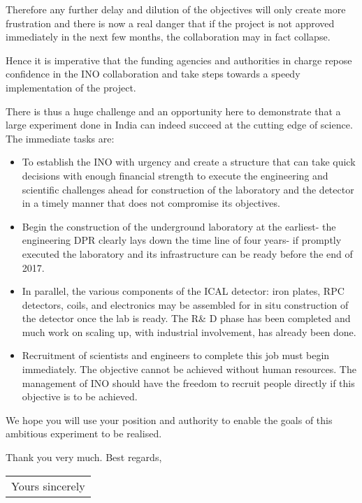 Therefore any further delay and dilution of the objectives will only
create more frustration and there is now a real danger that if the project
is not approved immediately in the next few months, the collaboration may
in fact collapse.


Hence it is imperative that the funding agencies and autho\-rities in charge
repose confidence in the INO collaboration and take steps towards a speedy
implementation of the project.

There is thus a huge challenge and an opportunity here to demonstrate that
a large experiment done in India can indeed succeed at the cutting edge of
science. The immediate tasks are:

\begin{itemize}
\itemsep=0pt
\item To establish the INO with urgency and create a structure that can take
quick decisions with enough financial stren\-gth to execute the engineering
and scientific challenges ahead for construction of the laboratory and the
detector in a timely manner that does not compromise its objectives.

\item Begin the construction of the underground laboratory at the earliest-
the engineering DPR clearly lays down the time line of four years- if
promptly executed the laboratory and its infrastructure can be ready
before the end of 2017.

\item In parallel, the various components of the ICAL detector: iron plates,
RPC detectors, coils, and electronics may be assembled for in situ
construction of the detector once the lab is ready. The R\& D phase has
been completed and much work on scaling up, with industrial involvement,
has already been done.

\item Recruitment of scientists and engineers to complete this job must begin
immediately. The objective cannot be achie\-ved without human resources.
The management of INO should have the freedom to recruit people directly
if this objective is to be achieved.
\end{itemize}

We hope you will use your position and authority to enable the goals of
this ambitious experiment to be realised.

Thank you very much. Best regards,

\begin{flushright}
\begin{tabular}{c}
Yours sincerely \phantom{WWW} 
\end{tabular}
\end{flushright}


